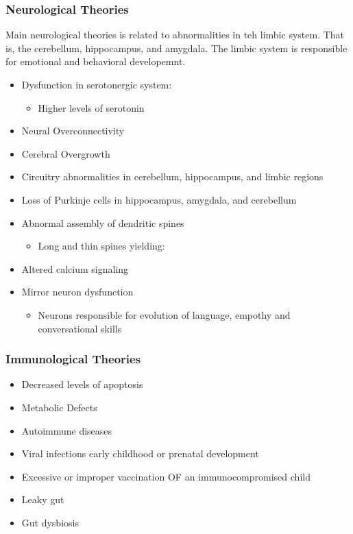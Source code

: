 \documentclass[journal]{IEEEtran}
\begin{document}
\subsubsection{Neurological Theories}
Main neurological theories is related to abnormalities in teh limbic system. That is, the cerebellum, hippocampus, and amygdala. The limbic system is responsible for emotional and behavioral developemnt.
\begin{itemize}
\item Dysfunction in serotonergic system:
\begin{itemize}
\item Higher levels of serotonin
\end{itemize}
\item Neural Overconnectivity
\item Cerebral Overgrowth
\item Circuitry abnormalities in cerebellum, hippocampus, and limbic regions
\item Loss of Purkinje cells in hippocampus, amygdala, and cerebellum
\item Abnormal assembly of dendritic spines
\begin{itemize}
\item Long and thin spines yielding:
\end{itemize}
\item Altered calcium signaling
\item Mirror neuron dysfunction
\begin{itemize}
\item Neurons responsible for evolution of language, empothy and conversational skills
\end{itemize}
\end{itemize}
\subsubsection{Immunological Theories}
\begin{itemize}
\item Decreased levels of apoptosis
\item Metabolic Defects
\item Autoimmune diseases
\item Viral infections early childhood or prenatal development
\item Excessive or improper vaccination OF an immunocompromised child
\item Leaky gut
\item Gut dysbiosis
\end{itemize}
\end{document}
